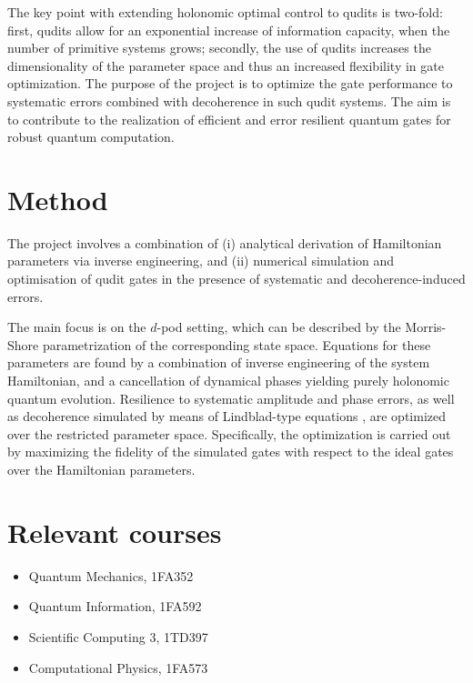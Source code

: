 \documentclass{article}
\begin{document}
The key point with extending holonomic optimal control to qudits is two-fold: first, qudits 
allow for an exponential increase of information capacity, when the number of primitive 
systems grows; secondly, the use of qudits increases the dimensionality of the parameter space and 
thus an increased flexibility in gate optimization. The purpose of the project is to 
optimize the gate performance to systematic errors combined with decoherence 
in such qudit systems. The aim is to contribute to the realization of efficient and error 
resilient quantum gates for robust quantum computation. 

\section*{Method}
The project involves a combination of (i) analytical derivation of Hamiltonian parameters 
via inverse engineering, and (ii) numerical simulation and optimisation of qudit gates in the 
presence of systematic and decoherence-induced errors. 

The main focus is on the $d$-pod setting, which can be described by the 
Morris-Shore parametrization \cite{morris83,kyoseva06} of the corresponding state 
space. Equations for these parameters are found by a combination of inverse engineering 
of the system Hamiltonian, and a cancellation of dynamical phases yielding purely 
holonomic quantum evolution. Resilience to systematic amplitude and phase errors, as well 
as decoherence simulated by means of Lindblad-type equations \cite{nielsen00}, are 
optimized over the restricted parameter space. Specifically, the optimization is carried 
out by maximizing the fidelity of the simulated gates with respect to the ideal gates over 
the Hamiltonian parameters. 

\section*{Relevant courses}
\begin{itemize}

\item Quantum Mechanics, 1FA352

\item Quantum Information, 1FA592

\item Scientific Computing 3, 1TD397

\item Computational Physics, 1FA573

\end{itemize}
\end{document}
